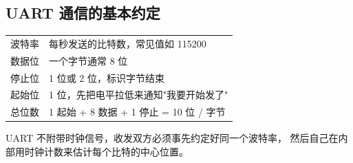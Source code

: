 \subsection{UART 通信的基本约定}

\begin{center}
\begin{tabular}{l l}
波特率 & 每秒发送的比特数，常见值如 115200 \\
数据位 & 一个字节通常 8 位 \\
停止位 & 1 位或 2 位，标识字节结束 \\
起始位 & 1 位，先把电平拉低来通知"我要开始发了" \\
\hline
总位数 & 1 起始 + 8 数据 + 1 停止 = 10 位 / 字节 \\
\end{tabular}
\end{center}

UART 不附带时钟信号，收发双方必须事先约定好同一个波特率，
然后自己在内部用时钟计数来估计每个比特的中心位置。
